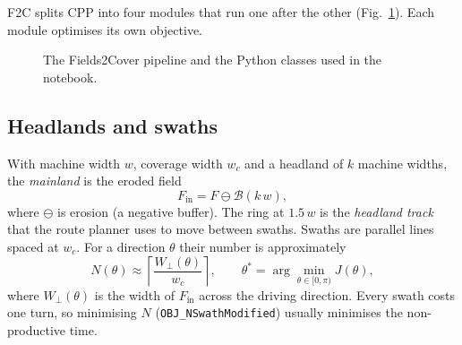 \documentclass[11pt,a4paper]{article}
\newcommand{\code}[1]{\texttt{\small #1}}
\begin{document}
F2C splits CPP into four modules that run one after the other (Fig.~\ref{fig:pipeline}). Each module optimises its own objective.

\begin{figure}[h]
\centering
{}
\caption{The Fields2Cover pipeline and the Python classes used in the notebook.}
\label{fig:pipeline}
\end{figure}

\subsection{Headlands and swaths}
With machine width $w$, coverage width $w_c$ and a headland of $k$ machine widths, the \emph{mainland} is the eroded field
\begin{equation}
F_{\text{in}} = F \ominus \mathcal B(k\,w),
\end{equation}
where $\ominus$ is erosion (a negative buffer). The ring at $1.5\,w$ is the \emph{headland track} that the route planner uses
to move between swaths. Swaths are parallel lines spaced at $w_c$. For a direction $\theta$ their number is approximately
\begin{equation}
N(\theta)\approx\left\lceil\frac{W_\perp(\theta)}{w_c}\right\rceil,\qquad
\theta^*=\arg\min_{\theta\in[0,\pi)}J(\theta),
\end{equation}
where $W_\perp(\theta)$ is the width of $F_{\text{in}}$ across the driving direction. Every swath costs one turn, so
minimising $N$ (\code{OBJ\_NSwathModified}) usually minimises the non-productive time.
\end{document}
